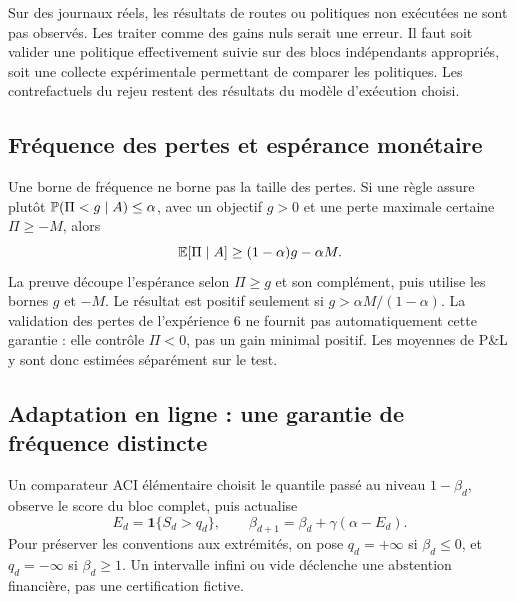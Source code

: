 Sur des journaux réels, les résultats de routes ou politiques non exécutées ne sont pas observés. Les traiter comme des gains nuls serait une erreur. Il faut soit valider une politique effectivement suivie sur des blocs indépendants appropriés, soit une collecte expérimentale permettant de comparer les politiques. Les contrefactuels du rejeu restent des résultats du modèle d'exécution choisi.

\subsection{Fréquence des pertes et espérance monétaire}

Une borne de fréquence ne borne pas la taille des pertes. Si une règle assure plutôt \(\mathbb P(\Pi<g\mid A)\le\alpha\), avec un objectif \(g>0\) et une perte maximale certaine \(\Pi\ge-M\), alors
\begin{equation}
 \mathbb E[\Pi\mid A]\ge(1-\alpha)g-\alpha M.
 \label{eq:ext-expectation}
\end{equation}
La preuve découpe l'espérance selon \(\Pi\ge g\) et son complément, puis utilise les bornes \(g\) et \(-M\). Le résultat est positif seulement si \(g>\alpha M/(1-\alpha)\). La validation des pertes de l'expérience 6 ne fournit pas automatiquement cette garantie : elle contrôle \(\Pi<0\), pas un gain minimal positif. Les moyennes de P\&L y sont donc estimées séparément sur le test.

\subsection{Adaptation en ligne : une garantie de fréquence distincte}

Un comparateur ACI élémentaire \cite{ext-aci} choisit le quantile passé au niveau \(1-\beta_d\), observe le score du bloc complet, puis actualise
\begin{equation}
 E_d=\mathbf1\{S_d>q_d\},\qquad
 \beta_{d+1}=\beta_d+\gamma(\alpha-E_d).
 \label{eq:ext-aci}
\end{equation}
Pour préserver les conventions aux extrémités, on pose \(q_d=+\infty\) si \(\beta_d\le0\), et \(q_d=-\infty\) si \(\beta_d\ge1\). Un intervalle infini ou vide déclenche une abstention financière, pas une certification fictive.


